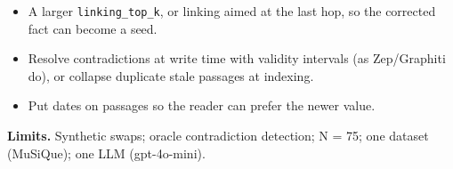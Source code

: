 \documentclass[10pt,a4paper]{article}
\newcommand{\sect}[1]{\par\vspace{3pt}{\large\bfseries #1}\par\vspace{0pt}}
\begin{document}
\sect{6. Next proposed improvements (proposals, not implemented)}
\begin{itemize}
\item A larger \texttt{linking\_top\_k}, or linking aimed at the last hop, so the corrected fact can become a seed.
\item Resolve contradictions at write time with validity intervals (as Zep/Graphiti do), or collapse duplicate stale passages at indexing.
\item Put dates on passages so the reader can prefer the newer value.
\end{itemize}

\textbf{Limits.} Synthetic swaps; oracle contradiction detection; N = 75; one dataset (MuSiQue); one LLM (gpt-4o-mini).
\end{document}
